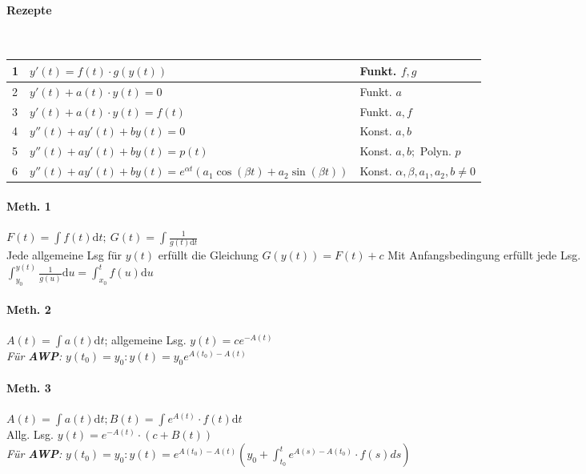 \documentclass[paper=a3,paper=landscape, fontsize=9pt, DIV=30]{scrartcl}
\begin{document}
\begin{multicols*}{4}
  \paragraph{Rezepte}\hspace{0pt}\\
  
  \begin{tabular}{|l| p{5cm}|l|}
    \hline
    1   & $y'(t)=f(t) \cdot g(y(t))$      & Funkt. $f,g$              \\ \hline
    2   & $y'(t)+a(t) \cdot y(t) = 0$     & Funkt. $a$                \\ \hline
    3   & $y'(t)+a(t) \cdot y(t) = f(t)$  & Funkt. $a,f$              \\ \hline
    4   & $y''(t)+ay'(t)+by(t) = 0$       & Konst. $a,b$              \\ \hline
    5   & $y''(t)+ay'(t)+by(t) = p(t)$    & Konst. $a,b;$ Polyn. $p$  \\ \hline
    6   & $y''(t)+ay'(t)+by(t) = e^{\alpha t} (a_1 \cos(\beta t)+ a_2 \sin(\beta t))$  & Konst. $\alpha,\beta,a_1, a_2,  b \neq 0$            \\ \hline
  \end{tabular}

  \paragraph{Meth. 1}
  $F(t)=\int f(t) \mathrm{d}t;\ G(t)=\int \frac{1}{g(t)\mathrm{d}t}$\\
  Jede allgemeine Lsg für $y(t)$ erfüllt die Gleichung $G(y(t))=F(t)+c$
  Mit Anfangsbedingung erfüllt jede Lsg. $\int_{y_0}^{y(t)}\frac{1}{g(u)}\mathrm{d}u=\int_{x_0}^{t}f(u)\mathrm{d}u$

  \paragraph{Meth. 2}
  $A(t)=\int a(t)\mathrm{d}t$; allgemeine Lsg. $y(t)=ce^{-A(t)}$\\
  \textit{Für \textbf{AWP}:} $y(t_0)=y_0: y(t)=y_0e^{A(t_0)-A(t)}$

  \paragraph{Meth. 3}
  $A(t)=\int a(t)\mathrm{d}t; B(t)=\int e^{A(t)} \cdot f(t) \mathrm{d}t$\\
  Allg. Lsg. $y(t)=e^{-A(t)} \cdot (c+B(t))$\\
  \textit{Für \textbf{AWP}:} $y(t_0)=y_0: y(t)=e^{A(t_0)-A(t)}(y_0+\int_{t_0}^{t}e^{A(s)-A(t_0)}\cdot f(s) ds)$


\end{multicols*}
\end{document}
